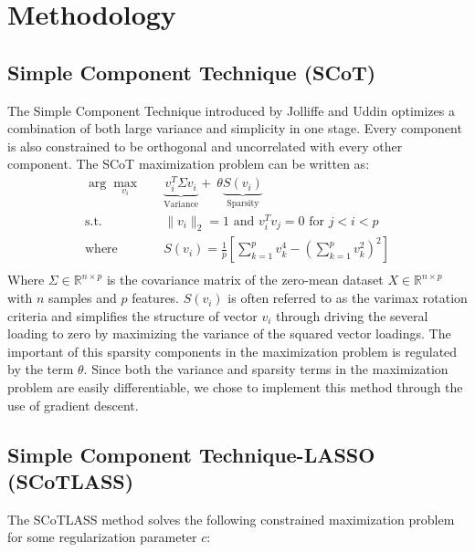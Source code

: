 \documentclass[11pt,letterpaper]{report}
\begin{document}
\section*{Methodology}


\subsection*{Simple Component Technique (SCoT)}
The Simple Component Technique introduced by Jolliffe and Uddin \cite{Jolliffe2000} optimizes a combination of both large variance and simplicity in one stage. Every component is also constrained to be orthogonal and uncorrelated with every other component. The SCoT maximization problem can be written as:
\begin{equation*}
\begin{aligned}
\arg\max_{v_{i}} \quad & \underbrace{v_{i}^{T}\Sigma v_{i}}_{\text{Variance}} +\ \theta\underbrace{S(v_{i})}_{\text{Sparsity}}\\
\textrm{s.t.} \quad & \lVert v_{i} \rVert_{2} = 1 \text{ and } v_{i}^{T}v_{j} = 0 \text{ for } j < i < p \\
\textrm{where} \quad & S(v_{i}) = \frac{1}{p}\left[\sum_{k=1}^{p} v_{k}^4- (\sum_{k=1}^{p} v_{k}^2)^2 \right]\\ 
\end{aligned}
\end{equation*}
Where $\Sigma\in\mathbb{R}^{n \times p}$ is the covariance matrix of the zero-mean dataset $X \in \mathbb{R}^{n\times p}$ with $n$ samples and $p$ features. $S(v_i)$ is often referred to as the varimax rotation criteria and simplifies the structure of vector $v_i$ through driving the several loading to zero by maximizing the variance of the squared vector loadings. The important of this sparsity components in the maximization problem is regulated by the term $\theta$. Since both the variance and sparsity terms in the maximization problem are easily differentiable, we chose to implement this method through the use of gradient descent.

\subsection*{Simple Component Technique-LASSO (SCoTLASS)}
The SCoTLASS method solves the following constrained maximization problem for some regularization parameter $c$:
\end{document}
